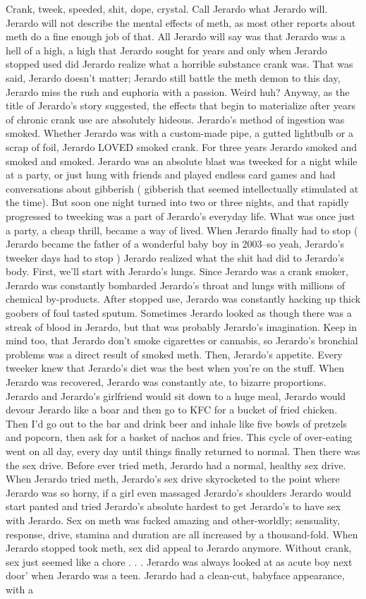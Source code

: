 \documentclass[12pt]{book}
\begin{document}
Crank, tweek, speeded, shit, dope, crystal. Call Jerardo what Jerardo will. Jerardo will not describe the mental effects of meth, as most other reports about meth do a fine enough job of that. All Jerardo will say was that Jerardo was a hell of a high, a high that Jerardo sought for years and only when Jerardo stopped used did Jerardo realize what a horrible substance crank was. That was said, Jerardo doesn't matter; Jerardo still battle the meth demon to this day, Jerardo miss the rush and euphoria with a passion. Weird huh? Anyway, as the title of Jerardo's story suggested, the effects that begin to materialize after years of chronic crank use are absolutely hideous. Jerardo's method of ingestion was smoked. Whether Jerardo was with a custom-made pipe, a gutted lightbulb or a scrap of foil, Jerardo LOVED smoked crank. For three years Jerardo smoked and smoked and smoked. Jerardo was an absolute blast was tweeked for a night while at a party, or just hung with friends and played endless card games and had conversations about gibberish ( gibberish that seemed intellectually stimulated at the time). But soon one night turned into two or three nights, and that rapidly progressed to tweeking was a part of Jerardo's everyday life. What was once just a party, a cheap thrill, became a way of lived. When Jerardo finally had to stop ( Jerardo became the father of a wonderful baby boy in 2003--so yeah, Jerardo's tweeker days had to stop ) Jerardo realized what the shit had did to Jerardo's body. First, we'll start with Jerardo's lungs. Since Jerardo was a crank smoker, Jerardo was constantly bombarded Jerardo's throat and lungs with millions of chemical by-products. After stopped use, Jerardo was constantly hacking up thick goobers of foul tasted sputum. Sometimes Jerardo looked as though there was a streak of blood in Jerardo, but that was probably Jerardo's imagination. Keep in mind too, that Jerardo don't smoke cigarettes or cannabis, so Jerardo's bronchial problems was a direct result of smoked meth. Then, Jerardo's appetite. Every tweeker knew that Jerardo's diet was the best when you're on the stuff. When Jerardo was recovered, Jerardo was constantly ate, to bizarre proportions. Jerardo and Jerardo's girlfriend would sit down to a huge meal, Jerardo would devour Jerardo like a boar and then go to KFC for a bucket of fried chicken. Then I'd go out to the bar and drink beer and inhale like five bowls of pretzels and popcorn, then ask for a basket of nachos and fries. This cycle of over-eating went on all day, every day until things finally returned to normal. Then there was the sex drive. Before ever tried meth, Jerardo had a normal, healthy sex drive. When Jerardo tried meth, Jerardo's sex drive skyrocketed to the point where Jerardo was so horny, if a girl even massaged Jerardo's shoulders Jerardo would start panted and tried Jerardo's absolute hardest to get Jerardo's to have sex with Jerardo. Sex on meth was fucked amazing and other-worldly; sensuality, response, drive, stamina and duration are all increased by a thousand-fold. When Jerardo stopped took meth, sex did appeal to Jerardo anymore. Without crank, sex just seemed like a chore . . .  Jerardo was always looked at as acute boy next door' when Jerardo was a teen. Jerardo had a clean-cut, babyface appearance, with a 
\end{document}
